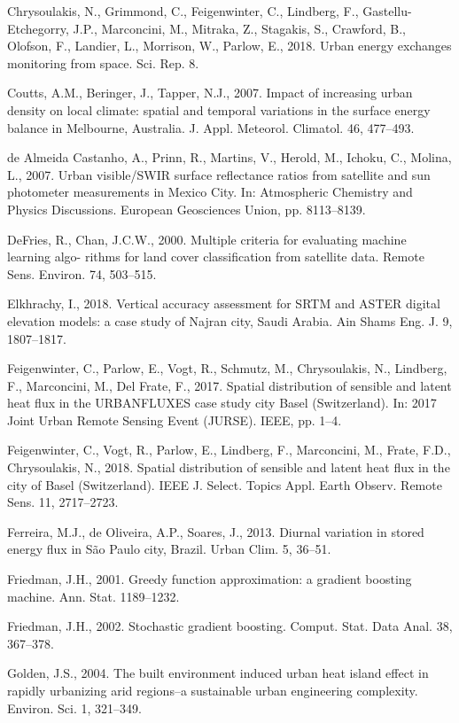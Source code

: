 \documentclass[3p,times]{elsarticle}
\begin{document}
Chrysoulakis, N., Grimmond, C., Feigenwinter, C., Lindberg, F., Gastellu-Etchegorry, J.P., Marconcini, M., Mitraka, Z., Stagakis, S., Crawford, B., Olofson, F., Landier, L., Morrison, W., Parlow, E., 2018. Urban energy exchanges monitoring from space. Sci. Rep. 8.

Coutts, A.M., Beringer, J., Tapper, N.J., 2007. Impact of increasing urban density on local climate: spatial and temporal variations in the surface energy balance in Melbourne, Australia. J. Appl. Meteorol. Climatol. 46, 477–493.

de Almeida Castanho, A., Prinn, R., Martins, V., Herold, M., Ichoku, C., Molina, L., 2007. Urban visible/SWIR surface reflectance ratios from satellite and sun photometer measurements in Mexico City. In: Atmospheric Chemistry and Physics Discussions. European Geosciences Union, pp. 8113–8139.

DeFries, R., Chan, J.C.W., 2000. Multiple criteria for evaluating machine learning algo- rithms for land cover classification from satellite data. Remote Sens. Environ. 74, 503–515.

Elkhrachy, I., 2018. Vertical accuracy assessment for SRTM and ASTER digital elevation models: a case study of Najran city, Saudi Arabia. Ain Shams Eng. J. 9, 1807–1817.

Feigenwinter, C., Parlow, E., Vogt, R., Schmutz, M., Chrysoulakis, N., Lindberg, F., Marconcini, M., Del Frate, F., 2017. Spatial distribution of sensible and latent heat flux in the URBANFLUXES case study city Basel (Switzerland). In: 2017 Joint Urban Remote Sensing Event (JURSE). IEEE, pp. 1–4.

Feigenwinter, C., Vogt, R., Parlow, E., Lindberg, F., Marconcini, M., Frate, F.D., Chrysoulakis, N., 2018. Spatial distribution of sensible and latent heat flux in the city of Basel (Switzerland). IEEE J. Select. Topics Appl. Earth Observ. Remote Sens. 11, 2717–2723.

Ferreira, M.J., de Oliveira, A.P., Soares, J., 2013. Diurnal variation in stored energy flux in São Paulo city, Brazil. Urban Clim. 5, 36–51.

Friedman, J.H., 2001. Greedy function approximation: a gradient boosting machine. Ann. Stat. 1189–1232.

Friedman, J.H., 2002. Stochastic gradient boosting. Comput. Stat. Data Anal. 38, 367–378.

Golden, J.S., 2004. The built environment induced urban heat island effect in rapidly urbanizing arid regions–a sustainable urban engineering complexity. Environ. Sci. 1, 321–349.
\end{document}
